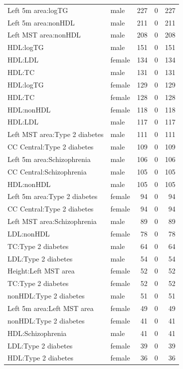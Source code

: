 \begin{table}[ht]
\begin{tabular}{llrrr}
  Left 5m area:logTG & male & 227 &   0 & 227 \\ 
  Left 5m area:nonHDL & male & 211 &   0 & 211 \\ 
  Left MST area:nonHDL & male & 208 &   0 & 208 \\ 
  HDL:logTG & male & 151 &   0 & 151 \\ 
  HDL:LDL & female & 134 &   0 & 134 \\ 
  HDL:TC & male & 131 &   0 & 131 \\ 
  HDL:logTG & female & 129 &   0 & 129 \\ 
  HDL:TC & female & 128 &   0 & 128 \\ 
  HDL:nonHDL & female & 118 &   0 & 118 \\ 
  HDL:LDL & male & 117 &   0 & 117 \\ 
  Left MST area:Type 2 diabetes & male & 111 &   0 & 111 \\ 
  CC Central:Type 2 diabetes & male & 109 &   0 & 109 \\ 
  Left 5m area:Schizophrenia & male & 106 &   0 & 106 \\ 
  CC Central:Schizophrenia & male & 105 &   0 & 105 \\ 
  HDL:nonHDL & male & 105 &   0 & 105 \\ 
  Left 5m area:Type 2 diabetes & female &  94 &   0 &  94 \\ 
  CC Central:Type 2 diabetes & female &  94 &   0 &  94 \\ 
  Left MST area:Schizophrenia & male &  89 &   0 &  89 \\ 
  LDL:nonHDL & female &  78 &   0 &  78 \\ 
  TC:Type 2 diabetes & male &  64 &   0 &  64 \\ 
  LDL:Type 2 diabetes & male &  54 &   0 &  54 \\ 
  Height:Left MST area & female &  52 &   0 &  52 \\ 
  TC:Type 2 diabetes & female &  52 &   0 &  52 \\ 
  nonHDL:Type 2 diabetes & male &  51 &   0 &  51 \\ 
  Left 5m area:Left MST area & female &  49 &   0 &  49 \\ 
  nonHDL:Type 2 diabetes & female &  41 &   0 &  41 \\ 
  HDL:Schizophrenia & male &  41 &   0 &  41 \\ 
  LDL:Type 2 diabetes & female &  39 &   0 &  39 \\ 
  HDL:Type 2 diabetes & female &  36 &   0 &  36 \\ 

\end{tabular}
\end{table}
